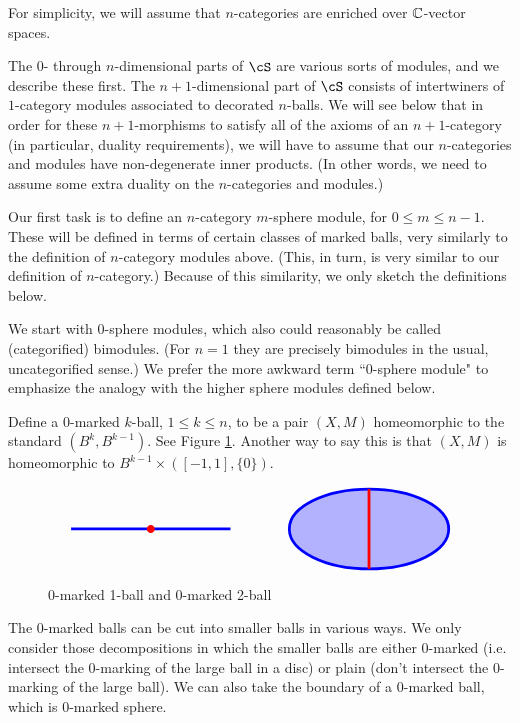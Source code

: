 For simplicity, we will assume that $n$-categories are enriched over $\mathbb{C}$-vector spaces.

The $0$- through $n$-dimensional parts of $\cS$ are various sorts of modules, and we describe
these first.
The $n{+}1$-dimensional part of $\cS$ consists of intertwiners
of  $1$-category modules associated to decorated $n$-balls.
We will see below that in order for these $n{+}1$-morphisms to satisfy all of
the axioms of an $n{+}1$-category (in particular, duality requirements), we will have to assume
that our $n$-categories and modules have non-degenerate inner products.
(In other words, we need to assume some extra duality on the $n$-categories and modules.)

\medskip

Our first task is to define an $n$-category $m$-sphere module, for $0\le m \le n-1$.
These will be defined in terms of certain classes of marked balls, very similarly
to the definition of $n$-category modules above.
(This, in turn, is very similar to our definition of $n$-category.)
Because of this similarity, we only sketch the definitions below.

We start with $0$-sphere modules, which also could reasonably be called (categorified) bimodules.
(For $n=1$ they are precisely bimodules in the usual, uncategorified sense.)
We prefer the more awkward term ``0-sphere module" to emphasize the analogy
with the higher sphere modules defined below.

Define a $0$-marked $k$-ball, $1\le k \le n$, to be a pair  $(X, M)$ homeomorphic to the standard
$(B^k, B^{k-1})$.
See Figure \ref{feb21a}.
Another way to say this is that $(X, M)$ is homeomorphic to $B^{k-1}\times([-1,1], \{0\})$.

\begin{figure}[t]
$$\tikz[baseline,line width=2pt]{\draw[blue] (-2,0)--(2,0); \fill[red] (0,0) circle (0.1);} \qquad \qquad \tikz[baseline,line width=2pt]{\draw[blue][fill=blue!30!white] (0,0) circle (2 and 1); \draw[red] (0,1)--(0,-1);}$$
\caption{0-marked 1-ball and 0-marked 2-ball}
\label{feb21a}
\end{figure}

The $0$-marked balls can be cut into smaller balls in various ways.
We only consider those decompositions in which the smaller balls are either
$0$-marked (i.e. intersect the $0$-marking of the large ball in a disc) 
or plain (don't intersect the $0$-marking of the large ball).
We can also take the boundary of a $0$-marked ball, which is $0$-marked sphere.

